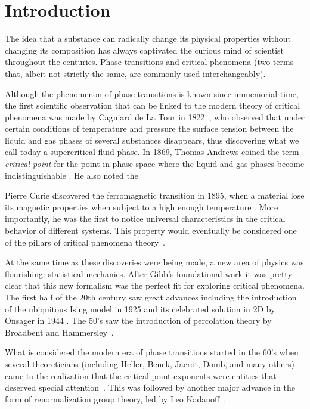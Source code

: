 \chapter{Introduction}
\label{ch1-intr}


The idea that a substance can radically change its physical properties without
changing its composition has always captivated the curious mind of scientist
throughout the centuries.
Phase transitions and critical phenomena (two terms that, albeit not strictly
the same, are commonly used interchangeably).

Although the phenomenon of phase transitions is known since immemorial time,
the first scientific observation that can be linked to the modern theory of
critical phenomena was made by Cagniard de La Tour in 1822~\cite{delaTour1822},
who observed that under certain conditions of temperature and pressure the
surface tension between the liquid and gas phases of several substances
disappears, thus discovering what we call today a supercritical fluid phase. In
1869, Thomas Andrews coined the term \textit{critical point} for the point in
phase space where the liquid and gas phases become indistinguishable
\cite{Andrews1869}. He also noted the

Pierre Curie discovered the ferromagnetic transition in 1895, when a material
lose its magnetic properties when subject to a high enough temperature
\cite{Curie1895}. More importantly, he was the first to notice universal
characteristics in the critical behavior of different systems. This property
would eventually be considered one of the pillars of critical phenomena
theory~\cite{Stanley1999}.

At the same time as these discoveries were being made, a new area of physics
was flourishing: statistical mechanics. After Gibb's foundational work
\cite{Gibbs1906} it was pretty clear that this new formalism was the perfect
fit for exploring critical phenomena. The first half of the 20th century saw
great advances including the introduction of the ubiquitous Ising model in 1925
\cite{Ising1925} and its celebrated solution in 2D by Onsager in 1944
\cite{Onsager1944}. The 50's saw the introduction of percolation theory by
Broadbent and Hammersley~\cite{Broadbent1957}.

What is considered the modern era of phase transitions started in the 60's when
several theoreticians (including Heller, Benek, Jacrot, Domb, and many others)
came to the realization that the critical point exponents were entities that
deserved special attention~\cite{Stanley1999, Stanley1971}. This was followed
by another major advance in the form of renormalization group theory, led by
Leo Kadanoff~\cite{Kadanoff1966}.

